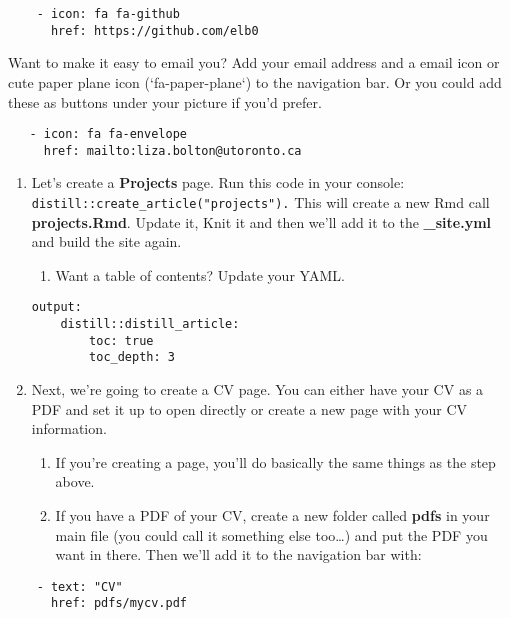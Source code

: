 \documentclass[
]{article}
\providecommand{\tightlist}{%
  \setlength{\itemsep}{0pt}\setlength{\parskip}{0pt}}
\begin{document}
\begin{verbatim}
    - icon: fa fa-github
      href: https://github.com/elb0
\end{verbatim}

Want to make it easy to email you? Add your email address and a email icon or cute paper plane icon (`fa-paper-plane`) to the navigation bar. Or you could add these as buttons under your picture if you'd prefer.

\begin{verbatim}
   - icon: fa fa-envelope
     href: mailto:liza.bolton@utoronto.ca
\end{verbatim}

\begin{enumerate}
\def\labelenumi{\arabic{enumi}.}
\setcounter{enumi}{6}
\item
  Let's create a \textbf{Projects} page. Run this code in your console: \texttt{distill::create\_article("projects").} This will create a new Rmd call \textbf{projects.Rmd}. Update it, Knit it and then we'll add it to the \textbf{\_site.yml} and build the site again.

  \begin{enumerate}
  \def\labelenumii{\arabic{enumii}.}
  \tightlist
  \item
    Want a table of contents? Update your YAML.
  \end{enumerate}

\begin{verbatim}
output:
    distill::distill_article:
        toc: true
        toc_depth: 3
\end{verbatim}
\item
  Next, we're going to create a CV page. You can either have your CV as a PDF and set it up to open directly or create a new page with your CV information.

  \begin{enumerate}
  \def\labelenumii{\arabic{enumii}.}
  \item
    If you're creating a page, you'll do basically the same things as the step above.
  \item
    If you have a PDF of your CV, create a new folder called \textbf{pdfs} in your main file (you could call it something else too\ldots) and put the PDF you want in there. Then we'll add it to the navigation bar with:
  \end{enumerate}
\end{enumerate}

\begin{verbatim}
    - text: "CV"  
      href: pdfs/mycv.pdf
\end{verbatim}
\end{document}
